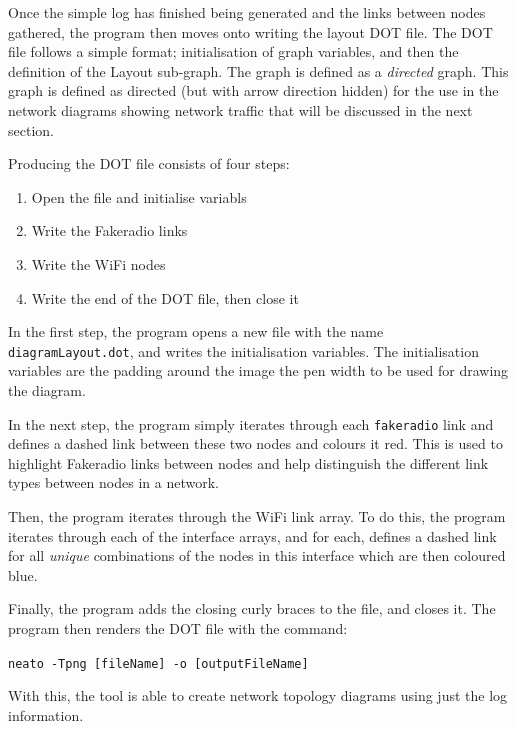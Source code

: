 Once the simple log has finished being generated and the links between nodes gathered, the program then moves onto writing the layout DOT file.
The DOT file follows a simple format; initialisation of graph variables, and then the definition of the Layout sub-graph.
The graph is defined as a \emph{directed} graph.
This graph is defined as directed (but with arrow direction hidden) for the use in the network diagrams showing network traffic that will be discussed in the next section.

Producing the DOT file consists of four steps:
\begin{enumerate}
    \item Open the file and initialise variabls
    \item Write the Fakeradio links
    \item Write the WiFi nodes
    \item Write the end of the DOT file, then close it
\end{enumerate}

In the first step, the program opens a new file with the name \texttt{diagramLayout.dot}, and writes the initialisation variables.
The initialisation variables are the padding around the image the pen width to be used for drawing the diagram.

In the next step, the program simply iterates through each \texttt{fakeradio} link and defines a dashed link between these two nodes and colours it red.
This is used to highlight Fakeradio links between nodes and help distinguish the different link types between nodes in a network.


Then, the program iterates through the WiFi link array. 
To do this, the program iterates through each of the interface arrays, and for each, defines a dashed link for all \emph{unique} combinations of the nodes in this interface which are then coloured blue.

Finally, the program adds the closing curly braces to the file, and closes it.
The program then renders the DOT file with the command:

\texttt{neato -Tpng [fileName] -o [outputFileName]}

With this, the tool is able to create network topology diagrams using just the log information.


